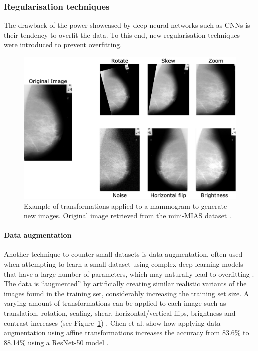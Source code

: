 \subsubsection{Regularisation techniques}

The drawback of the power showcased by deep neural networks such as CNNs is their tendency to overfit the data. To this end, new regularisation techniques were introduced to prevent overfitting.

\begin{figure}[ht]
\centerline{\includegraphics[width=\textwidth]{figures/litsurvey/Data augmentation examples.png}}
\caption{\label{fig:litsurvey-Data augmentation example}Example of transformations applied to a mammogram to generate new images. Original image retrieved from the mini-MIAS dataset \citep{Suckling1994}.}
\end{figure}

\paragraph{Data augmentation}
\label{sec:litsurvey-data-augmentation}

Another technique to counter small datasets is data augmentation, often used when attempting to learn a small dataset using complex deep learning models that have a large number of parameters, which may naturally lead to overfitting \citep{Jadoon2017}. The data is ``augmented'' by artificially creating similar realistic variants of the images found in the training set, considerably increasing the training set size. A varying amount of transformations can be applied to each image such as translation, rotation, scaling, shear, horizontal/vertical flips, brightness and contrast increases (see Figure~\ref{fig:litsurvey-Data augmentation example}) \citep{Hepsag2017}. Chen et al. show how applying data augmentation using affine transformations increases the accuracy from 83.6\% to 88.14\% using a ResNet-50 model \citep{Chen2019}.

